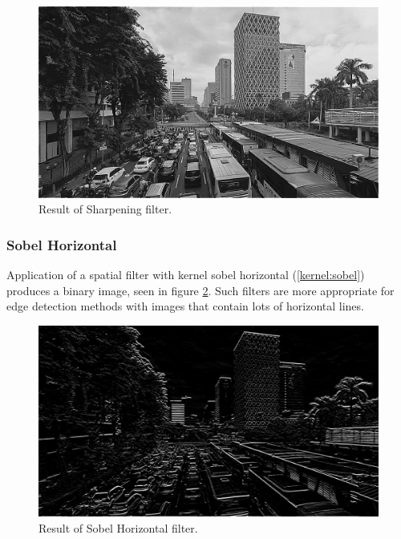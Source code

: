 \begin{figure}
    \includegraphics[width=0.8\linewidth, center]{images/output-image/input1-sharpen.png}
    \caption{Result of Sharpening filter.}
    \label{fig:output-sharpen}
\end{figure}

\subsubsection{Sobel Horizontal}

Application of a spatial filter with kernel sobel horizontal (\ref{kernel:sobel}) produces a binary image, seen in figure \ref{fig:output-sobelhor}. Such filters are more appropriate for edge detection methods with images that contain lots of horizontal lines.

\begin{figure}
    \includegraphics[width=0.8\linewidth, center]{images/output-image/input1-sobelhor.png}
    \caption{Result of Sobel Horizontal filter.}
    \label{fig:output-sobelhor}
\end{figure}

